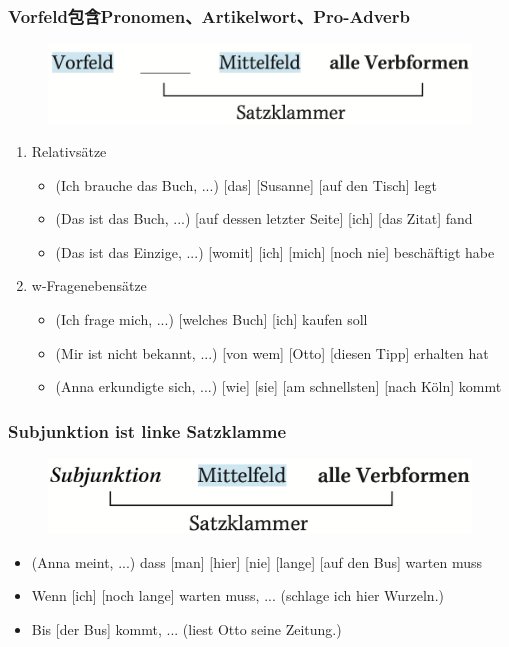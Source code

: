 \documentclass[UTF8]{report}
\begin{document}
\subsubsection{Vorfeld包含Pronomen、Artikelwort、Pro-Adverb}
\begin{figure}[H]
    \centering
    \includegraphics[scale=0.5]{w3.png}
\end{figure}
\begin{enumerate}
    \item Relativsätze
    \begin{itemize}
        \item (Ich brauche das Buch, ...) [das]  [Susanne] [auf den Tisch] legt
        \item (Das ist das Buch, ...) [auf dessen letzter Seite]  [ich] [das Zitat] fand
        \item (Das ist das Einzige, ...) [womit]  [ich] [mich] [noch nie] beschäftigt habe
    \end{itemize}
    \item w-Fragenebensätze
    \begin{itemize}
        \item (Ich frage mich, ...) [welches Buch]  [ich] kaufen soll
        \item (Mir ist nicht bekannt, ...) [von wem]  [Otto] [diesen Tipp] erhalten hat
        \item (Anna erkundigte sich, ...) [wie]  [sie] [am schnellsten] [nach Köln] kommt
    \end{itemize}
\end{enumerate}


\subsubsection{Subjunktion ist linke Satzklamme}
\begin{figure}[H]
    \centering
    \includegraphics[scale=0.5]{w4.png}
\end{figure}
\begin{itemize}
    \item (Anna meint, ...) dass [man] [hier] [nie] [lange] [auf den Bus] warten muss
    \item Wenn [ich] [noch lange] warten muss, ... (schlage ich hier Wurzeln.)
    \item Bis [der Bus] kommt, ... (liest Otto seine Zeitung.)
\end{itemize}
\end{document}
